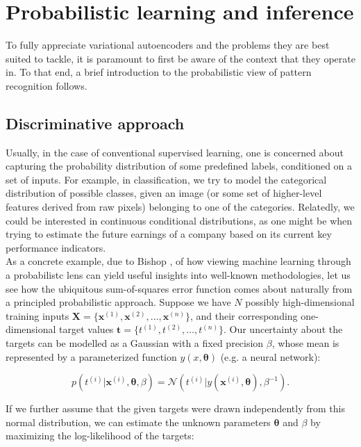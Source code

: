 \documentclass{report}
\begin{document}
\section{Probabilistic learning and inference}

To fully appreciate variational autoencoders and the problems they are best suited to tackle, it is paramount to first be aware of the context that they operate in. To that end, a brief introduction to the probabilistic view of pattern recognition follows. \\

\subsection{Discriminative approach}

\noindent Usually, in the case of conventional supervised learning, one is concerned about capturing the probability distribution of some predefined labels, conditioned on a set of inputs. For example, in classification, we try to model the categorical distribution of possible classes, given an image (or some set of higher-level features derived from raw pixels) belonging to one of the categories. Relatedly, we could be interested in continuous conditional distributions, as one might be when trying to estimate the future earnings of a company based on its current key performance indicators. \\

\noindent As a concrete example, due to Bishop \cite{bishop-prml}, of how viewing machine learning through a probabilistc lens can yield useful insights into well-known methodologies, let us see how the ubiquitous sum-of-squares error function comes about naturally from a principled probabilistic approach. Suppose we have $N$ possibly high-dimensional training inputs $\mathbf{\boldsymbol{X}} = \{\boldsymbol{x}^{(1)}, \boldsymbol{x}^{(2)}, \dots, \boldsymbol{x}^{(n)}\}$, and their corresponding one-dimensional target values $\mathbf{t} = \{t^{(1)}, t^{(2)}, \dots, t^{(n)}\}$. Our uncertainty about the targets can be modelled as a Gaussian with a fixed precision $\beta$, whose mean is represented by a parameterized function $y(x, \boldsymbol{\theta})$ (e.g. a neural network):

\[ p(t^{(i)}|\boldsymbol{x}^{(i)}, \boldsymbol{\theta}, \beta)  = \mathcal{N} (t^{(i)} | y(\boldsymbol{x}^{(i)}, \boldsymbol{\theta}), \beta^{-1}). \]

\noindent If we further assume that the given targets were drawn independently from this normal distribution, we can estimate the unknown parameters $\boldsymbol{\theta}$ and $\beta$ by maximizing the log-likelihood of the targets:
\end{document}
